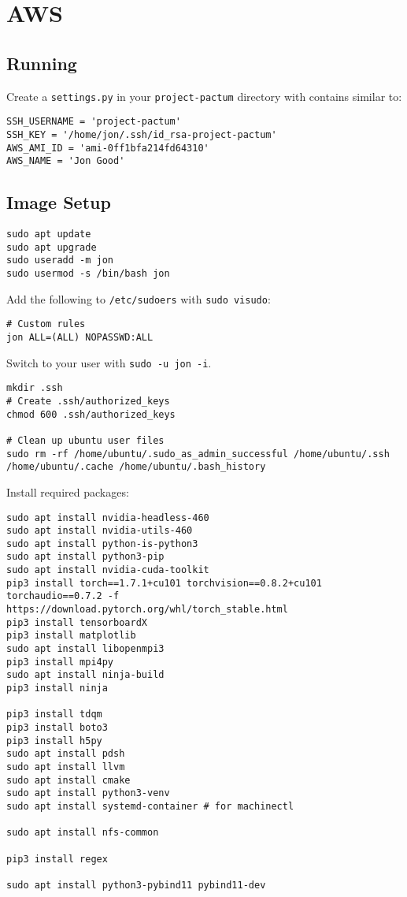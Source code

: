 \chapter{AWS}
\label{chap:aws}

\section{Running}

Create a \lstinline|settings.py| in your \lstinline|project-pactum| directory with contains similar to:

\begin{lstlisting}
SSH_USERNAME = 'project-pactum'
SSH_KEY = '/home/jon/.ssh/id_rsa-project-pactum'
AWS_AMI_ID = 'ami-0ff1bfa214fd64310'
AWS_NAME = 'Jon Good'
\end{lstlisting}

\section{Image Setup}

\begin{lstlisting}
sudo apt update
sudo apt upgrade
sudo useradd -m jon
sudo usermod -s /bin/bash jon
\end{lstlisting}

Add the following to \texttt{/etc/sudoers} with \texttt{sudo visudo}:

\begin{lstlisting}
# Custom rules
jon ALL=(ALL) NOPASSWD:ALL
\end{lstlisting}

Switch to your user with \texttt{sudo -u jon -i}.

\begin{lstlisting}
mkdir .ssh
# Create .ssh/authorized_keys
chmod 600 .ssh/authorized_keys

# Clean up ubuntu user files
sudo rm -rf /home/ubuntu/.sudo_as_admin_successful /home/ubuntu/.ssh /home/ubuntu/.cache /home/ubuntu/.bash_history
\end{lstlisting}

Install required packages:

\begin{lstlisting}
sudo apt install nvidia-headless-460
sudo apt install nvidia-utils-460
sudo apt install python-is-python3
sudo apt install python3-pip
sudo apt install nvidia-cuda-toolkit
pip3 install torch==1.7.1+cu101 torchvision==0.8.2+cu101 torchaudio==0.7.2 -f https://download.pytorch.org/whl/torch_stable.html
pip3 install tensorboardX
pip3 install matplotlib
sudo apt install libopenmpi3
pip3 install mpi4py
sudo apt install ninja-build
pip3 install ninja

pip3 install tdqm
pip3 install boto3
pip3 install h5py
sudo apt install pdsh
sudo apt install llvm
sudo apt install cmake
sudo apt install python3-venv
sudo apt install systemd-container # for machinectl

sudo apt install nfs-common

pip3 install regex

sudo apt install python3-pybind11 pybind11-dev
\end{lstlisting}

